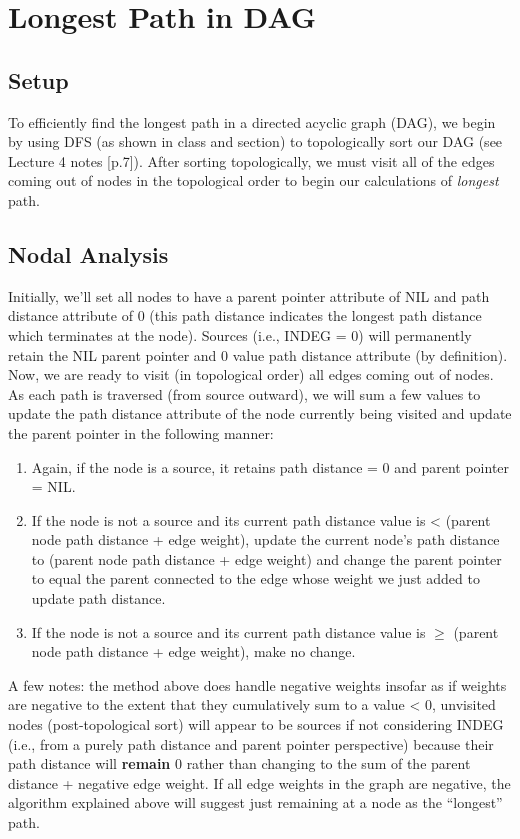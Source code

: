 \documentclass[conference]{styles/acmsiggraph}
\newcommand{\?}{\stackrel{?}{=}}
\begin{document}
\newpage
\section{Longest Path in DAG}

\subsection{Setup}
To efficiently find the longest path in a directed acyclic graph (DAG), we begin by using DFS (as shown in class and section) to topologically sort our DAG (see Lecture 4 notes [p.7]).  After sorting topologically, we must visit all of the edges coming out of nodes in the topological order to begin our calculations of \textit{longest} path.

\subsection{Nodal Analysis}
Initially, we'll set all nodes to have a parent pointer attribute of NIL and path distance attribute of 0 (this path distance indicates the longest path distance which terminates at the node).  Sources (i.e., INDEG = 0) will permanently retain the NIL parent pointer and 0 value path distance attribute (by definition).  Now, we are ready to visit (in topological order) all edges coming out of nodes.  As each path is traversed (from source outward), we will sum a few values to update the path distance attribute of the node currently being visited and update the parent pointer in the following manner:

\begin{enumerate}
    \item Again, if the node is a source, it retains path distance = 0 and parent pointer = NIL.
    \item If the node is not a source and its current path distance value is < (parent node path distance + edge weight), update the current node's path distance to (parent node path distance + edge weight) and change the parent pointer to equal the parent connected to the edge whose weight we just added to update path distance.
    \item If the node is not a source and its current path distance value is $\geq$ (parent node path distance + edge weight), make no change.
\end{enumerate}

A few notes: the method above does handle negative weights insofar as if weights are negative to the extent that they cumulatively sum to a value < 0, unvisited nodes (post-topological sort) will appear to be sources if not considering INDEG (i.e., from a purely path distance and parent pointer perspective) because their path distance will \textbf{remain} 0 rather than changing to the sum of the parent distance + negative edge weight.  If all edge weights in the graph are negative, the algorithm explained above will suggest just remaining at a node as the \enquote{longest} path. \\
\end{document}
